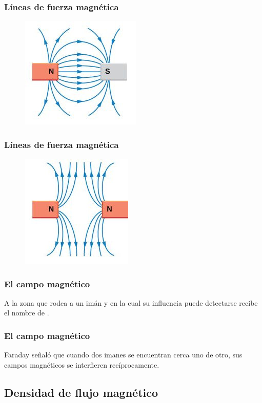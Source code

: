\documentclass[14pt]{beamer}
\begin{document}
\begin{frame}
\frametitle{Líneas de fuerza magnética}
\begin{figure}
    \centering
    \includegraphics[scale=1]{Imagenes/Magnetismo_03b.jpg}
\end{figure}
\end{frame}
\begin{frame}
\frametitle{Líneas de fuerza magnética}
\begin{figure}
    \centering
    \includegraphics[scale=1]{Imagenes/Magnetismo_03c.jpg}
\end{figure}
\end{frame}
\begin{frame}
\frametitle{El campo magnético}
A la zona que rodea a un imán y en la cual su influencia puede detectarse recibe el nombre de .
\end{frame}
\begin{frame}
\frametitle{El campo magnético}
Faraday señaló que cuando dos imanes se encuentran cerca uno de otro, sus campos magnéticos se interfieren recíprocamente.
\end{frame}

\subsection{Densidad de flujo magnético}
\end{document}

